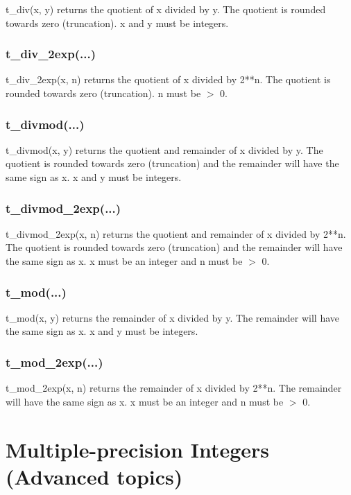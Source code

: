 t\_div(x, y) returns the quotient of x divided by y. The quotient is rounded towards zero
(truncation). x and y must be integers.

\subsubsection{t\_div\_2exp(...)}

t\_div\_2exp(x, n) returns the quotient of x divided by 2**n. The quotient is rounded towards zero
(truncation). n must be $>$ 0.

\subsubsection{t\_divmod(...)}

t\_divmod(x, y) returns the quotient and remainder of x divided by y. The quotient is rounded
towards zero (truncation) and the remainder will have the same sign as x. x and y must be
integers.

\subsubsection{t\_divmod\_2exp(...)}

t\_divmod\_2exp(x, n) returns the quotient and remainder of x divided by 2**n. The quotient is
rounded towards zero (truncation) and the remainder will have the same sign as x. x must be
an integer and n must be $>$ 0.

\subsubsection{t\_mod(...)}

t\_mod(x, y) returns the remainder of x divided by y. The remainder will have the same sign as
x. x and y must be integers.

\subsubsection{t\_mod\_2exp(...)}

t\_mod\_2exp(x, n) returns the remainder of x divided by 2**n. The remainder will have the same
sign as x. x must be an integer and n must be $>$ 0.






\newpage
\section{Multiple-precision Integers (Advanced topics)}

